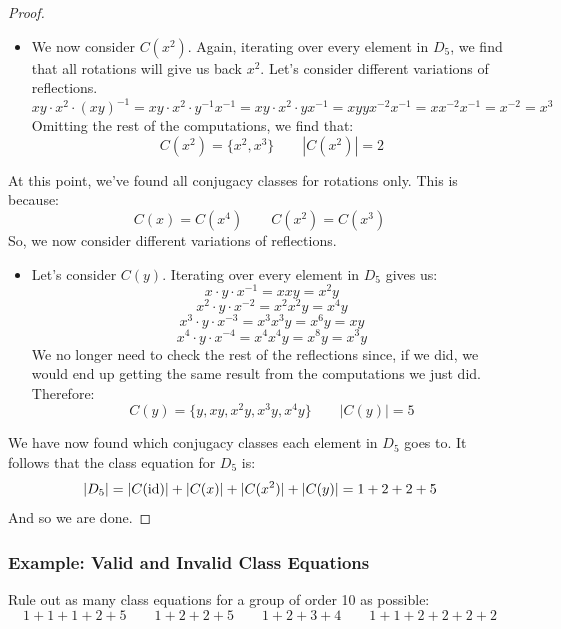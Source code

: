 \documentclass[letterpaper]{article}
\begin{document}
\begin{mdframed}
\begin{proof}
\begin{itemize}
            \item We now consider $C(x^2)$. Again, iterating over every element in $D_5$, we find that all rotations will give us back $x^2$. Let's consider different variations of reflections. 
            \[xy \cdot x^2 \cdot (xy)^{-1} = xy \cdot x^2 \cdot y^{-1} x^{-1} = xy \cdot x^2 \cdot y x^{-1} = xy yx^{-2} x^{-1} = x x^{-2} x^{-1} = x^{-2} = x^{3}\]
            Omitting the rest of the computations, we find that: 
            \[C(x^2) = \{x^2, x^3\} \qquad |C(x^2)| = 2\]
        \end{itemize}
        At this point, we've found all conjugacy classes for rotations only. This is because: 
        \[C(x) = C(x^4) \qquad C(x^2) = C(x^3)\]
        So, we now consider different variations of reflections. 
        \begin{itemize}
            \item Let's consider $C(y)$. Iterating over every element in $D_5$ gives us: 
            \[x \cdot y \cdot x^{-1} = xxy = x^2 y\]
            \[x^2 \cdot y \cdot x^{-2} = x^2 x^2 y = x^4 y\]
            \[x^3 \cdot y \cdot x^{-3} = x^3 x^3 y = x^6 y = xy\]
            \[x^4 \cdot y \cdot x^{-4} = x^4 x^4 y = x^8 y = x^3 y\]
            We no longer need to check the rest of the reflections since, if we did, we would end up getting the same result from the computations we just did. Therefore: 
            \[C(y) = \{y, xy, x^2 y, x^3 y, x^4 y\} \qquad |C(y)| = 5\]
        \end{itemize}
        We have now found which conjugacy classes each element in $D_5$ goes to. It follows that the class equation for $D_5$ is: 
        \[|D_5| = |C(\operatorname{id})| + |C(x)| + |C(x^2)| + |C(y)| = 1 + 2 + 2 + 5\]
        And so we are done. 
    \end{proof}
\end{mdframed}

\subsubsection{Example: Valid and Invalid Class Equations}
Rule out as many class equations for a group of order 10 as possible:
\[1 + 1 + 1 + 2 + 5 \qquad 1 + 2 + 2 + 5 \qquad 1 + 2 + 3 + 4 \qquad 1 + 1 + 2 + 2 + 2 + 2\]
\end{document}
